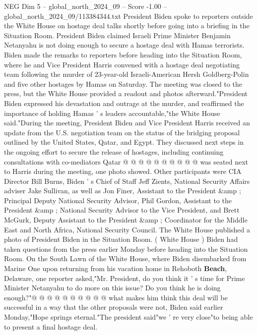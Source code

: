 \begin{textsample}{NEG Dim 5 – global\_north\_2024\_09 – Score -1.00 – global\_north\_2024\_09/113384344.txt}  \label{ex:f5_neg_141}
President Biden spoke to reporters outside the White House on hostage deal talks shortly before going into a briefing in the Situation Room.
President Biden claimed Israeli Prime Minister Benjamin Netanyahu is not doing enough to secure a hostage deal with Hamas terrorists.
Biden made the remarks to reporters before heading into the Situation Room, where he and Vice President Harris convened with a hostage deal negotiating team following the murder of 23-year-old Israeli-American Hersh Goldberg-Polin and five other hostages by Hamas on Saturday.
The meeting was closed to the press, but the White House provided a readout and photos afterward."President Biden expressed his devastation and outrage at the murder, and reaffirmed the importance of holding Hamas ' s leaders accountable,"the White House said."During the meeting, President Biden and Vice President Harris received an update from the U.S. negotiation team on the status of the bridging proposal outlined by the United States, Qatar, and Egypt.
They discussed next steps in the ongoing effort to secure the release of hostages, including continuing consultations with co-mediators Qatar @ @ @ @ @ @ @ @ @ @ was seated next to Harris during the meeting, one photo showed.
Other participants were CIA Director Bill Burns, Biden ' s Chief of Staff Jeff Zients, National Security Affairs adviser Jake Sullivan, as well as Jon Finer, Assistant to the President \&amp ; Principal Deputy National Security Advisor, Phil Gordon, Assistant to the President \&amp ; National Security Advisor to the Vice President, and Brett McGurk, Deputy Assistant to the President \&amp ; Coordinator for the Middle East and North Africa, National Security Council.
The White House published a photo of President Biden in the Situation Room. ( White House ) Biden had taken questions from the press earlier Monday before heading into the Situation Room.
On the South Lawn of the White House, where Biden disembarked from Marine One upon returning from his vacation home in Rehoboth \textbf{Beach}, Delaware, one reporter asked,"Mr.
President, do you think it ' s time for Prime Minister Netanyahu to do more on this issue?
Do you think he is doing enough?"@ @ @ @ @ @ @ @ @ @ what makes him think this deal will be successful in a way that the other proposals were not, Biden said earlier Monday,"Hope springs eternal."The president said"we ' re very close"to being able to present a final hostage deal.

\end{textsample}
